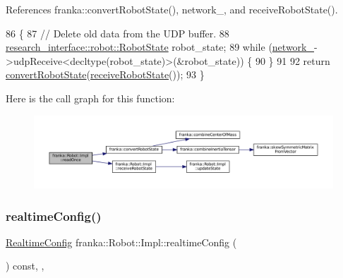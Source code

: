 References franka\+::convert\+Robot\+State(), network\+\_\+, and receive\+Robot\+State().


\begin{DoxyCode}
86                                \{
87   \textcolor{comment}{// Delete old data from the UDP buffer.}
88   \hyperlink{structresearch__interface_1_1robot_1_1RobotState}{research\_interface::robot::RobotState} robot\_state;
89   \textcolor{keywordflow}{while} (\hyperlink{classfranka_1_1Robot_1_1Impl_acecf3b158ccd1c2ed7e76971f1e6a192}{network\_}->udpReceive<decltype(robot\_state)>(&robot\_state)) \{
90   \}
91 
92   \textcolor{keywordflow}{return} \hyperlink{namespacefranka_a0eaee201f8afdb02f6530269cb581cbb}{convertRobotState}(\hyperlink{classfranka_1_1Robot_1_1Impl_a15161988fd2644aa2757e196e4488b38}{receiveRobotState}());
93 \}
\end{DoxyCode}
Here is the call graph for this function\+:
\nopagebreak
\begin{figure}[H]
\begin{center}
\leavevmode
\includegraphics[width=350pt]{classfranka_1_1Robot_1_1Impl_a0de2609b63c0f9ab6bab6e7180c021bf_cgraph}
\end{center}
\end{figure}
\mbox{\label{classfranka_1_1Robot_1_1Impl_a60b2747318e7c957834c62e83c204fbc}} 
\subsubsection{\texorpdfstring{realtime\+Config()}{realtimeConfig()}}
{\footnotesize\ttfamily \hyperlink{namespacefranka_aeede4f4629390fea21ca5e5a35a8a943}{Realtime\+Config} franka\+::\+Robot\+::\+Impl\+::realtime\+Config (\begin{DoxyParamCaption}{ }\end{DoxyParamCaption}) const\hspace{0.3cm}{\ttfamily [override]}, {\ttfamily [virtual]}, {\ttfamily [noexcept]}}



